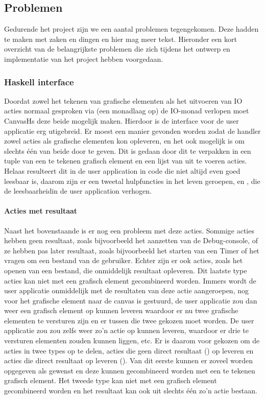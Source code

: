 \subsection{Problemen}

Gedurende het project zijn we een aantal problemen tegengekomen. Deze hadden te maken met zaken en dingen en hier mag meer tekst. Hieronder een kort overzicht van de belangrijkste problemen die zich tijdens het ontwerp en implementatie van het project hebben voorgedaan.

\subsubsection{Haskell interface}
Doordat zowel het tekenen van grafische elementen als het uitvoeren van IO acties normaal gesproken via (een monadlaag op) de IO-monad verlopen moet CanvasHs deze beide mogelijk maken. Hierdoor is de interface voor de user applicatie erg utigebreid. 
Er moest een manier gevonden worden zodat de handler zowel acties als grafische elementen kon opleveren, en het ook mogelijk is om slechts één van beide door te geven. Dit is gedaan door dit te verpakken in een tuple van een te tekenen grafisch element en een lijst van uit te voeren acties. Helaas resulteert dit in de user application in code die niet altijd even goed leesbaar is, daarom zijn er een tweetal hulpfuncties in het leven geroepen,  en , die de leesbaarheidin de user application verhogen.

\paragraph{Acties met resultaat}
Naast het bovenstaande is er nog een probleem met deze acties. Sommige acties hebben geen resultaat, zoals bijvoorbeeld het aanzetten van de Debug-console, of ze hebben pas later resultaat, zoals bijvoorbeeld het starten van een Timer of het vragen om een bestand van de gebruiker. Echter zijn er ook acties, zoals het openen van een bestand, die onmiddelijk resultaat opleveren. 
Dit laatste type acties kan niet met een grafisch element gecombineerd worden. Immers wordt de user applicatie onmiddelijk met de resultaten van deze actie aangeroepen, nog voor het grafische element naar de canvas is gestuurd, de user applicatie zou dan weer een grafisch element op kunnen leveren waardoor er nu twee grafische elementen te versturen zijn en er tussen die twee gekozen moet worden. De user applicatie zou zou zelfs weer zo'n actie op kunnen leveren, waardoor er drie te versturen elementen zouden kunnen liggen, etc. 
Er is daarom voor gekozen om de acties in twee types op te delen, acties die geen direct resultaat () op leveren en acties die direct resultaat op leveren (). Van dit eerste kunnen er zoveel worden opgegeven als gewenst en deze kunnen gecombineerd worden met een te tekenen grafisch element. Het tweede type kan niet met een grafisch element gecombineerd worden en het resultaat kan ook uit slechts één zo'n actie bestaan. 

